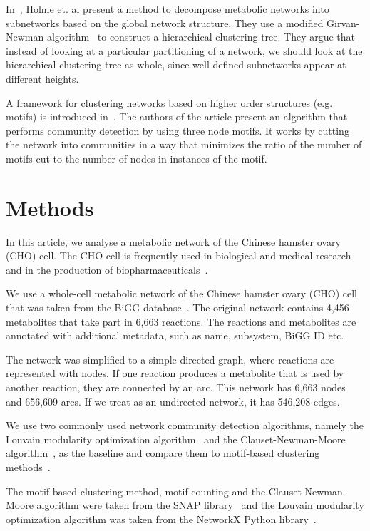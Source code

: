 In~\cite{holme2003subnetwork}, Holme et. al present a method to decompose
metabolic networks into subnetworks based on the global network structure. They
use a modified Girvan-Newman algorithm~\cite{girvan2002community} to construct a
hierarchical clustering tree. They argue that instead of looking at a particular
partitioning of a network, we should look at the hierarchical clustering tree as
whole, since well-defined subnetworks appear at different heights.

A framework for clustering networks based on higher order structures
(e.g. motifs) is introduced in~\cite{benson2016higher}. The authors of the
article present an algorithm that performs community detection by using three
node motifs. It works by cutting the network into communities in a way that
minimizes the ratio of the number of motifs cut to the number of nodes in
instances of the motif.

\section{Methods}
\label{sec:methods}

In this article, we analyse a metabolic network of the Chinese hamster
ovary (CHO) cell. The CHO cell is frequently used in biological and medical
research and in the production of biopharmaceuticals~\cite{chocons}.

We use a whole-cell metabolic network of the Chinese hamster ovary (CHO)
cell that was taken from the BiGG database~\cite{bigg,chocons}. The original
network contains 4,456 metabolites that take part in 6,663 reactions. The
reactions and metabolites are annotated with additional metadata, such as name,
subsystem, BiGG ID etc.

The network was simplified to a simple directed graph, where reactions are
represented with nodes. If one reaction produces a metabolite that is used by
another reaction, they are connected by an arc. This network has 6,663 nodes and
656,609 arcs. If we treat as an undirected network, it has 546,208 edges.

We use two commonly used network community detection algorithms, namely the
Louvain modularity optimization algorithm~\cite{blondel2008fast} and the
Clauset-Newman-Moore algorithm~\cite{clauset2004finding}, as the baseline and
compare them to motif-based clustering methods~\cite{benson2016higher}.

The motif-based clustering method, motif counting and the Clauset-Newman-Moore
algorithm were taken from the SNAP library~\cite{leskovec2016snap} and the
Louvain modularity optimization algorithm was taken from the NetworkX Python
library~\cite{networkx}.

